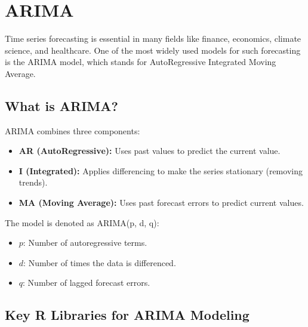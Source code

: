 \section{ARIMA}

Time series forecasting is essential in many fields like finance, economics, climate science, and healthcare. One of the most widely used models for such forecasting is the ARIMA model, which stands for AutoRegressive Integrated Moving Average.

\subsection*{What is ARIMA?}

ARIMA combines three components:
\begin{itemize}
    \item \textbf{AR (AutoRegressive):} Uses past values to predict the current value.
    \item \textbf{I (Integrated):} Applies differencing to make the series stationary (removing trends).
    \item \textbf{MA (Moving Average):} Uses past forecast errors to predict current values.
\end{itemize}

The model is denoted as ARIMA(p, d, q):
\begin{itemize}
    \item \( p \): Number of autoregressive terms.
    \item \( d \): Number of times the data is differenced.
    \item \( q \): Number of lagged forecast errors.
\end{itemize}

\subsection*{Key R Libraries for ARIMA Modeling}

